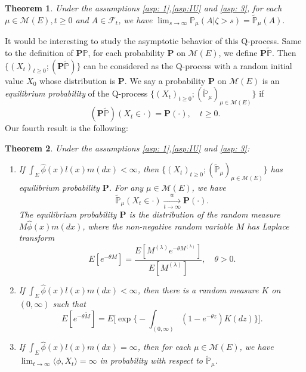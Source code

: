\documentclass[12pt,a4paper]{amsart}
\theoremstyle{plain}
\newtheorem{thm}{Theorem}[section]
\theoremstyle{definition}
\numberwithin{equation}{section}
\begin{document}
\begin{thm}\label{thm: Qprocess}
	Under the assumptions \ref{asp: 1},\ref{asp:IU} and \ref{asp: 3}, for each $\mu \in \mathcal M(E), t\geq 0$ and $A\in\mathscr F_t$, we have
$
	\lim_{s\rightarrow\infty}\mathbb P_\mu(A |\zeta>s)=\widetilde{\mathbb P}_\mu(A).
$
\end{thm}

	It would be interesting to study the asymptotic behavior of this Q-process.  Same to the definition of $\mathbf P\mathbb P$, for each probability $\mathbf P$ on $\mathcal M(E)$, we define $\mathbf P\widetilde{\mathbb P}$.  Then $\{(X_t)_{t\geq 0}; (\mathbf P\widetilde{\mathbb P})\}$ can be considered as the Q-process with a random initial value $X_0$ whose distribution is $\mathbf P$.
	We say a probability $\mathbf P$ on $\mathcal M(E)$ is an \emph{equilibrium probability} of the Q-process $\{(X_t)_{t\geq 0}; (\widetilde{\mathbb P}_\mu)_{\mu\in\mathcal M(E)}\}$ if
\[
	(\mathbf P\widetilde{\mathbb P})(X_t \in \cdot ) =\mathbf P(\cdot),	\quad t\geq 0.
\]
	Our fourth result is the following:

\begin{thm}\label{thm: structure of Qprocess}
	Under the assumptions \ref{asp: 1},\ref{asp:IU} and \ref{asp: 3}:
\begin{enumerate}
\item
	If $\int_E\hat\phi(x)l(x)m(dx)<\infty$, then $\{(X_t)_{t\geq 0};(\widetilde{\mathbb P}_\mu)_{\mu\in\mathcal M(E)}\}$ has equilibrium probability ${\mathbf P}$.
	For any $\mu\in\mathcal M(E)$, we have
\[
	\widetilde{\mathbb P}_\mu(X_t \in \cdot ) \xrightarrow[t\to \infty]{w} {\mathbf P}(\cdot).
\]
	The equilibrium probability $\mathbf P$ is the distribution of the random measure $M\widehat\phi(x)m(dx)$,
	where the non-negative random variable $M$ has Laplace transform
\[
  	E[e^{-\theta  M}] = \dfrac{E[M^{(\lambda)}e^{-\theta M^{(\lambda)}}]}{E[M^{(\lambda)}]},\quad \theta > 0.
\]
\item
  	If $\int_E\hat\phi(x)l(x)m(dx)<\infty$, then there is a random measure $K$ on $(0,\infty)$ such that
\[
	E[e^{-\theta \widetilde M}] = E\Big[\exp\Big\{- \int_{(0,\infty)} (1-e^{-\theta z }) K(dz) \Big\}\Big].
\]
\item
	If $\int_E\hat\phi(x)l(x)m(dx)=\infty$, then for each $\mu \in \mathcal M(E)$, we have $\lim_{t\rightarrow\infty}\langle \phi, X_t\rangle =\infty$ in probability with respect to $\widetilde{\mathbb P}_\mu$.
\end{enumerate}
\end{thm}
\end{document}

